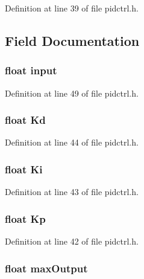 Definition at line 39 of file pidctrl.h.



\subsection{Field Documentation}
\hypertarget{struct_p_i_d_c_t_r_l_a0c92b536886cab3f637dce4b7a0956bd}{
\subsubsection[{input}]{\setlength{\rightskip}{0pt plus 5cm}float {\bf input}}}
\label{struct_p_i_d_c_t_r_l_a0c92b536886cab3f637dce4b7a0956bd}


Definition at line 49 of file pidctrl.h.

\hypertarget{struct_p_i_d_c_t_r_l_a98268d71502ba080d88a9b1f50fdbe80}{
\subsubsection[{Kd}]{\setlength{\rightskip}{0pt plus 5cm}float {\bf Kd}}}
\label{struct_p_i_d_c_t_r_l_a98268d71502ba080d88a9b1f50fdbe80}


Definition at line 44 of file pidctrl.h.

\hypertarget{struct_p_i_d_c_t_r_l_a59fac16f568541187ff485c4c47b0ec5}{
\subsubsection[{Ki}]{\setlength{\rightskip}{0pt plus 5cm}float {\bf Ki}}}
\label{struct_p_i_d_c_t_r_l_a59fac16f568541187ff485c4c47b0ec5}


Definition at line 43 of file pidctrl.h.

\hypertarget{struct_p_i_d_c_t_r_l_a09cfc766a233ad617270562cc4146d07}{
\subsubsection[{Kp}]{\setlength{\rightskip}{0pt plus 5cm}float {\bf Kp}}}
\label{struct_p_i_d_c_t_r_l_a09cfc766a233ad617270562cc4146d07}


Definition at line 42 of file pidctrl.h.

\hypertarget{struct_p_i_d_c_t_r_l_a69c7c584610d93d038b17f08d46b4fa1}{
\subsubsection[{maxOutput}]{\setlength{\rightskip}{0pt plus 5cm}float {\bf maxOutput}}}
\label{struct_p_i_d_c_t_r_l_a69c7c584610d93d038b17f08d46b4fa1}



